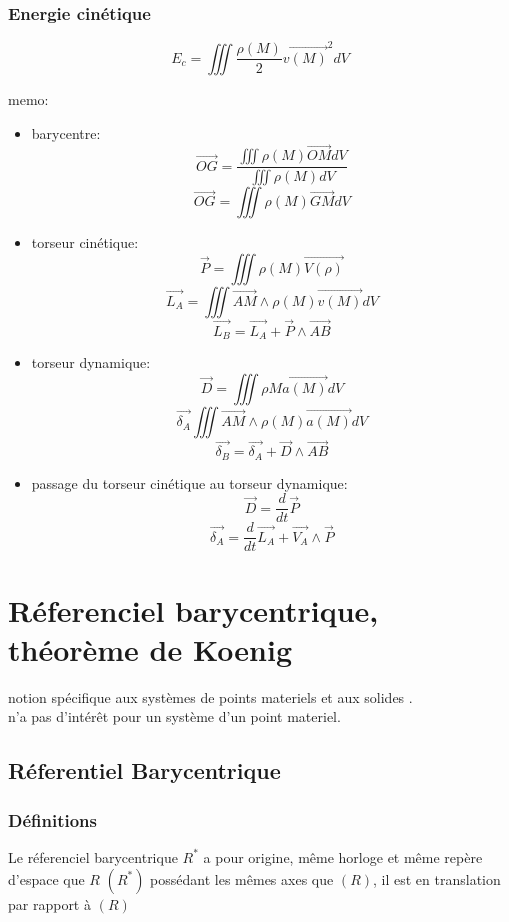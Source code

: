 \documentclass[../main.tex]{subfile}
\begin{document}
\subsubsection{Energie cinétique}
$$E_c = \iiint \frac{\rho(M)}{2} \vec{v(M)}^2 dV$$


\begin{rema}
	memo:
\begin{itemize}	
	\item barycentre:
	$$\vec{OG} = \frac{\iiint \rho(M) \vec{OM} dV}{\iiint \rho(M) dV}$$
	$$\vec{OG} = \iiint \rho(M) \vec{GM} dV$$
	
	\item torseur cinétique:
	$$\vec{P} = \iiint \rho(M)\vec{V(\rho)}$$
	$$\vec{L_A} = \iiint \vec{AM} \wedge \rho(M) \vec{v(M)} dV$$
	$$\vec{L_B} = \vec{L_A} + \vec{P} \wedge \vec{AB}$$

	\item torseur dynamique:
	$$\vec{D} = \iiint \rho{M} \vec{a(M)} dV$$
	$$\vec{\delta_A} \iiint \vec{AM} \wedge \rho(M) \vec{a(M)} dV$$
	$$\vec{\delta_B} = \vec{\delta_A} + \vec{D} \wedge \vec{AB}$$

	\item passage du torseur cinétique au torseur dynamique:
	$$\vec{D} = \frac{d}{dt} \vec{P}$$
	$$\vec{\delta_A} = \frac{d}{dt} \vec{L_A} + \vec{V_A} \wedge \vec{P}$$
\end{itemize}
\end{rema}

\section{Réferenciel barycentrique, théorème de Koenig}
notion spécifique aux systèmes de points materiels et aux solides .\\
n'a pas d'intérêt pour un système d'un point materiel.

\subsection{Réferentiel Barycentrique}
\subsubsection{Définitions}
\begin{defi}
	Le réferenciel barycentrique $R^*$ a pour origine, même horloge et même repère d'espace que $R$
	$(R^*)$ possédant les mêmes axes que $(R)$, il est en translation par rapport à $(R)$
\end{defi}
\end{document}
